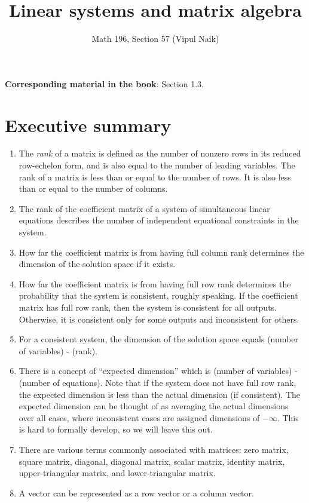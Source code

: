 \documentclass[10pt]{amsart}
\title{Linear systems and matrix algebra}
\author{Math 196, Section 57 (Vipul Naik)}
\begin{document}
\maketitle

{\bf Corresponding material in the book}: Section 1.3.

\section*{Executive summary}

\begin{enumerate}
\item The {\em rank} of a matrix is defined as the number of nonzero
  rows in its reduced row-echelon form, and is also equal to the
  number of leading variables. The rank of a matrix is less than or
  equal to the number of rows. It is also less than or equal to the
  number of columns.
\item The rank of the coefficient matrix of a system of simultaneous
  linear equations describes the number of independent equational
  constraints in the system.
\item How far the coefficient matrix is from having full column rank
  determines the dimension of the solution space if it exists.
\item How far the coefficient matrix is from having full row rank
  determines the probability that the system is consistent, roughly
  speaking. If the coefficient matrix has full row rank, then the
  system is consistent for all outputs. Otherwise, it is consistent
  only for some outputs and inconsistent for others.
\item For a consistent system, the dimension of the solution space
  equals (number of variables) - (rank).
\item There is a concept of ``expected dimension'' which is (number of
  variables) - (number of equations). Note that if the system does not
  have full row rank, the expected dimension is less than the actual
  dimension (if consistent). The expected dimension can be thought of
  as averaging the actual dimensions over all cases, where
  inconsistent cases are assigned dimensions of $-\infty$. This is
  hard to formally develop, so we will leave this out.
\item There are various terms commonly associated with matrices: zero
  matrix, square matrix, diagonal, diagonal matrix, scalar matrix,
  identity matrix, upper-triangular matrix, and lower-triangular
  matrix.
\item A vector can be represented as a row vector or a column vector.

\end{enumerate}
\end{document}
